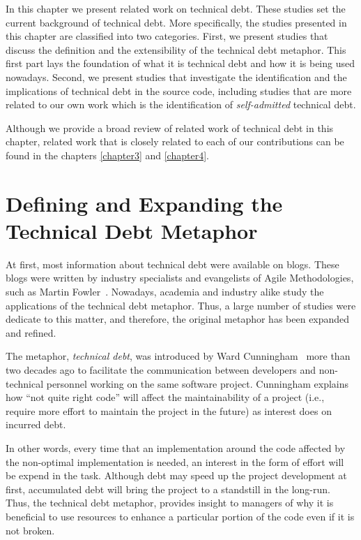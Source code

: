 
In this chapter we present related work on technical debt. These studies set the current background of technical debt. More specifically, the studies presented in this chapter are classified into two categories. First, we present studies that discuss the definition and the extensibility of the technical debt metaphor. This first part lays the foundation of what it is technical debt and how it is being used nowadays. Second, we present studies that investigate the identification and the implications of technical debt in the source code, including studies that are more related to our own work which is the identification of \emph{self-admitted} technical debt. 

Although we provide a broad review of related work of technical debt in this chapter, related work that is closely related to each of our contributions can be found in the chapters \ref{chapter3} and \ref{chapter4}.

\section{Defining and Expanding the Technical Debt Metaphor}
\label{defining_and_extending_technical_debt}

At first, most information about technical debt were available on blogs. These blogs were written by industry specialists and evangelists of Agile Methodologies, such as Martin Fowler~\cite{MartinFowler:TechnicalDebtQuadrant}. Nowadays, academia and industry alike study the applications of the technical debt metaphor. Thus, a large number of studies were dedicate to this matter, and therefore, the original metaphor has been expanded and refined.

The metaphor, \textit{technical debt}, was introduced by Ward Cunningham~\cite{Cunningham1992WPM} more than two decades ago to facilitate the communication between developers and non-technical personnel working on the same software project. Cunningham explains how ``not quite right code'' will affect the maintainability of a project (i.e., require more effort to maintain the project in the future) as interest does on incurred debt. 

In other words, every time that an implementation around the code affected by the non-optimal implementation is needed, an interest in the form of effort will be expend in the task. Although debt may speed up the project development at first, accumulated debt will bring the project to a standstill in the long-run. Thus, the technical debt metaphor, provides insight to managers of why it is beneficial to use resources to enhance a particular portion of the code even if it is not broken.

